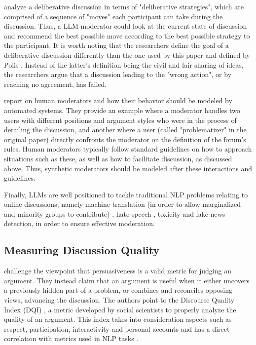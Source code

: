 \citet{al-khatib-etal-2018-modeling} analyze a deliberative discussion in terms of "deliberative strategies", which are comprised of a sequence of "moves" each participant can take during the discussion. Thus, a LLM moderator could look at the current state of discussion and recommend the best possible move according to the best possible strategy to the participant. It is worth noting that the researchers define the goal of a deliberative discussion differently than the one used by this paper and defined by Polis \cite{small-polis-llm}. Instead of the latter's definition being the civil and fair sharing of ideas, the researchers argue that a discussion leading to the "wrong action", or by reaching no agreement, has failed.

\citet{vecchi-2021-towards} report on human moderators and how their behavior should be modeled by automated systems. They provide an example where a moderator handles two users with different positions and argument styles who were in the process of derailing the discussion, and another where a user (called "problematizer" in the original paper) directly confronts the moderator on the definition of the forum's rules. Human moderators typically follow standard guidelines on how to approach situations such as these, as well as how to facilitate discussion, as discussed above. Thus, synthetic moderators should be modeled after these interactions and guidelines.

Finally, LLMs are well positioned to tackle traditional \ac{NLP} problems relating to online discussions; namely machine translation (in order to allow marginalized and minority groups to contribute) \cite{Tsai2024Generative}, hate-speech \cite{Nirmal2024TowardsIH, shi-2024-hatespeech}, toxicity \cite{kang-qian-2024-implanting, Wang2022ToxicityDW} and fake-news \cite{Liu2024DetectIJ, Xu2024ACS, Xu2024ACS} detection, in order to ensure effective moderation. 


\subsection{Measuring Discussion Quality}
\label{sec:related:measures}

\citet{vecchi-2021-towards} challenge the viewpoint that persuasiveness is a valid metric for judging an argument. They instead claim that an argument is useful when it either uncovers a previously hidden part of a problem, or combines and reconciles opposing views, advancing the discussion. The authors point to the Discourse Quality Index (DQI) \cite{Steiner2005-STEDPI-8, stab-gurevych-2017-parsing}, a metric developed by social scientists to properly analyze the quality of an argument. This index takes into consideration aspects such as respect, participation, interactivity and personal accounts and has a direct correlation with metrics used in NLP tasks \cite{wachsmuth-etal-2017-computational}. 

